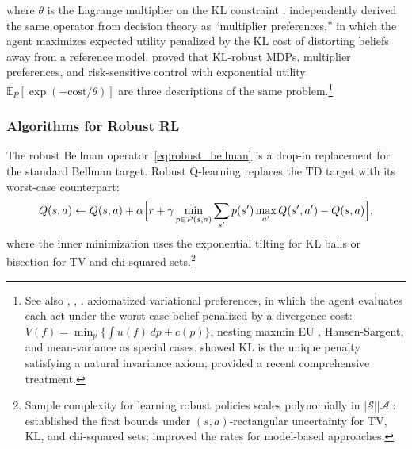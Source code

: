 where $\theta$ is the Lagrange multiplier on the KL
constraint \citep{Nilim2005}. \citet{HansenSargent2001}
independently derived the same operator from decision theory as
``multiplier preferences,'' in which the agent maximizes expected utility
penalized by the KL cost of distorting beliefs away from a reference
model. \citet{Petersen2000} proved that KL-robust MDPs, multiplier
preferences, and risk-sensitive control with exponential utility
$\mathbb{E}_P[\exp(-\text{cost}/\theta)]$ are three descriptions of the
same problem.\footnote{See also \citet{Whittle1981}, \citet{Jacobson1973},
\citet{Fleming1992}. \citet{Maccheroni2006}
axiomatized variational preferences, in which the agent evaluates each
act under the worst-case belief penalized by a divergence cost:
$V(f) = \min_p \{\int u(f)\,dp + c(p)\}$, nesting maxmin EU
\citep{GilboaSchmeidler1989}, Hansen-Sargent, and mean-variance as
special cases. \citet{Strzalecki2011} showed KL is the unique penalty
satisfying a natural invariance axiom; \citet{HansenSargent2024}
provided a recent comprehensive treatment.}


\subsubsection{Algorithms for Robust RL}
\label{subsubsec:robust_algorithms}

The robust Bellman operator~\eqref{eq:robust_bellman} is a drop-in
replacement for the standard Bellman target. Robust Q-learning replaces
the TD target with its worst-case counterpart:
\begin{equation}
  Q(s,a) \leftarrow Q(s,a) + \alpha\Bigl[
    r + \gamma \min_{p \in \mathcal{P}(s,a)} \sum_{s'} p(s')
    \max_{a'} Q(s',a') - Q(s,a)
  \Bigr],
  \label{eq:robust_q_learning}
\end{equation}
where the inner minimization uses the exponential tilting for KL balls or
bisection for TV and chi-squared
sets.\footnote{Sample complexity for learning robust policies scales
polynomially in $|\mathcal{S}||\mathcal{A}|$: \citet{Panaganti2022}
established the first bounds under $(s,a)$-rectangular uncertainty for TV,
KL, and chi-squared sets; \citet{clavier2024robust} improved the rates for
model-based approaches.}


